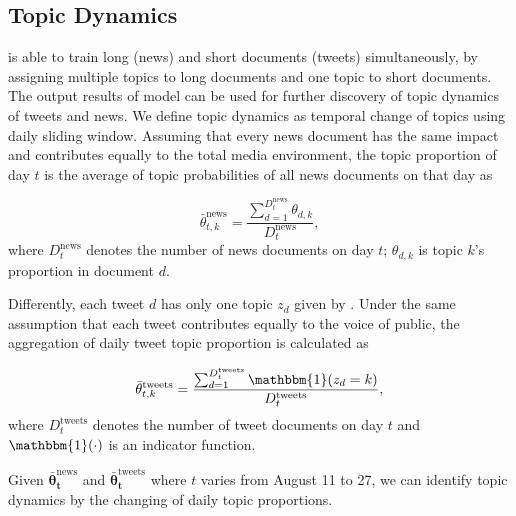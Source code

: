 \subsection{Topic Dynamics}
\stlda is able to train long (news) and short documents (tweets) simultaneously, by assigning multiple topics to long documents and one topic to short documents.
The output results of \stlda model can be used for further discovery of topic dynamics of tweets and news.
We define topic dynamics as temporal change of topics using daily sliding window.
Assuming that every news document has the same impact and contributes equally to the total media environment, the topic proportion of day $t$ is the average of topic probabilities of all news documents on that day as

\begin{equation}
\bar{\theta}_{t,k}^{\mathrm{news}}=\frac{\sum_{d=1}^{D_t^{\mathrm{news}}} \theta_{d,k}}{D_t^{\mathrm{news}}},
\end{equation}
where $D_t^{\mathrm{news}}$ denotes the number of news documents on day $t$; $\theta_{d,k}$ is topic $k$'s proportion in document $d$.

Differently, each tweet $d$ has only one topic $z_d$ given by \stlda. Under the same assumption that each tweet contributes equally to the voice of public, the aggregation of daily tweet topic proportion is calculated as

\begin{equation}
\bar{\theta}_{t,k}^{\mathrm{tweets}} = \frac{\sum_{d=1}^{D_t^{\mathrm{tweets}}} \mathbbm{1}(z_d=k)}{D_t^{\mathrm{tweets}}},
\end{equation}
where $D_t^{\mathrm{tweets}}$ denotes the number of tweet documents on day $t$ and $\mathbbm{1}(\cdot)$ is an indicator function.

Given $\bm{\bar{\theta}_t^{\mathrm{news}}}$ and $\bm{\bar{\theta}_t^{\mathrm{tweets}}}$ where $t$ varies from August 11 to 27, we can identify topic dynamics by the changing of daily topic proportions. 